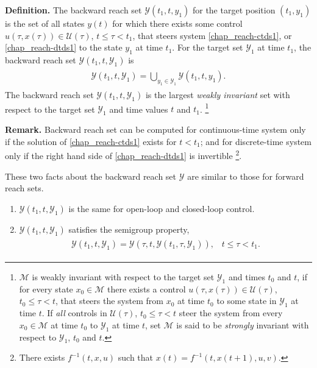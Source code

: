 \documentclass[letterpaper,10pt,english]{sphinxmanual}
\begin{document}
\textbf{Definition.} The backward reach set ${\mathcal Y}(t_1, t, y_1)$ for the target
position $(t_1, y_1)$ is the set of all states $y(t)$ for
which there exists some control
$u(\tau, x(\tau))\in{\mathcal U}(\tau)$,
$t\leqslant\tau<t_1$, that steers system \eqref{chap_reach-ctds1}, or \eqref{chap_reach-dtds1} to
the state $y_1$ at time $t_1$. For the target set
${\mathcal Y}_1$ at time $t_1$, the backward reach set
${\mathcal Y}(t_1, t, {\mathcal Y}_1)$ is
\label{chap_reach:equation-def_olbrs}\begin{gather}
\begin{split}{\mathcal Y}(t_1, t, {\mathcal Y}_1) = \bigcup_{y_1\in{\mathcal Y}_1}{\mathcal Y}(t_1, t, y_1).\end{split}\label{chap_reach-def_olbrs}
\end{gather}
The backward reach set
${\mathcal Y}(t_1, t, {\mathcal Y}_1)$ is the largest \emph{weakly
invariant} set with respect to the target set ${\mathcal Y}_1$ and
time values $t$ and $t_1$. \footnote{
${\mathcal M}$ is weakly invariant with respect to the target
set ${\mathcal Y}_1$ and times $t_0$ and $t$, if
for every state $x_0\in{\mathcal M}$ there exists a control
$u(\tau, x(\tau))\in{\mathcal U}(\tau)$,
$t_0\leqslant\tau< t$, that steers the system from $x_0$
at time $t_0$ to some state in ${\mathcal Y}_1$ at time
$t$. If \emph{all} controls in ${\mathcal U}(\tau)$,
$t_0\leqslant\tau<t$ steer the system from every
$x_0\in{\mathcal M}$ at time $t_0$ to
${\mathcal Y}_1$ at time $t$, set ${\mathcal M}$ is
said to be \emph{strongly} invariant with respect to
${\mathcal Y}_1$, $t_0$ and $t$.
}

\textbf{Remark.} Backward reach set can be computed for continuous-time
system only if the solution of \eqref{chap_reach-ctds1} exists for $t<t_1$; and
for discrete-time system only if the right hand side of \eqref{chap_reach-dtds1} is
invertible \footnote{
There exists $f^{-1}(t,x,u)$ such that
$x(t)=f^{-1}(t, x(t+1), u, v)$.
}.

These two facts about the backward reach set ${\mathcal Y}$ are
similar to those for forward reach sets.
\begin{enumerate}
\item {} 
${\mathcal Y}(t_1, t, {\mathcal Y}_1)$ is the same for
open-loop and closed-loop control.

\item {} 
${\mathcal Y}(t_1, t, {\mathcal Y}_1)$ satisfies the semigroup
property,
\label{chap_reach:equation-semigroup_b}\begin{gather}
\begin{split}{\mathcal Y}(t_1, t, {\mathcal Y}_1) = {\mathcal Y}(\tau, t, {\mathcal Y}(t_1, \tau, {\mathcal Y}_1)), \;\;\;
t\leqslant\tau< t_1.\end{split}\label{chap_reach-semigroup_b}
\end{gather}
\end{enumerate}
\end{document}

